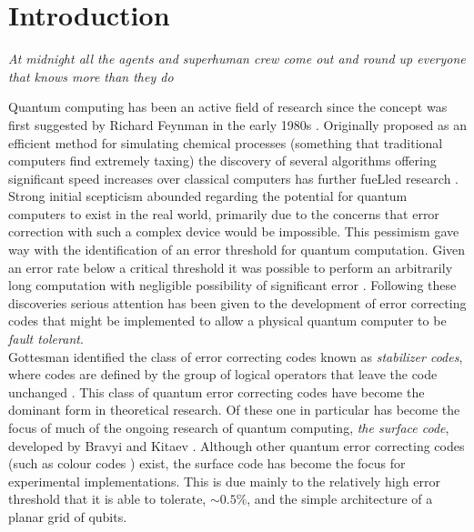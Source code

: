 
\chapter{Introduction}
\epigraph{\textit{At midnight all the agents and superhuman crew come out and round up everyone that knows more than they do}}{}
Quantum computing has been an active field of research since the concept was first suggested by Richard Feynman in the early 1980s \cite{Feynman1982}.
Originally proposed as an efficient method for simulating chemical processes (something that traditional computers find extremely taxing) the discovery of several algorithms offering significant speed increases over classical computers has further fueLled research \cite{Shor1994,Shor1997}.
Strong initial scepticism abounded regarding the potential for quantum computers to exist in the real world, primarily due to the concerns that error correction with such a complex device would be impossible\cite{Preskill1997}.
This pessimism gave way with the identification of an error threshold for quantum computation.
Given an error rate below a critical threshold it was possible to perform an arbitrarily long computation with negligible possibility of significant error \cite{Shor1996,Aharonov1997}.
Following these discoveries serious attention has been given to the development of error correcting codes that might be implemented to allow a physical quantum computer to be \emph{fault tolerant}.
\\
Gottesman identified the class of error correcting codes known as \emph{stabilizer codes}, where codes are defined by the group of logical operators that leave the code unchanged \cite{Gottesman1997a}.
This class of quantum error correcting codes have become the dominant form in theoretical research.
Of these one in particular has become the focus of much of the ongoing research of quantum computing, \emph{the surface code}, developed by Bravyi and Kitaev \cite{Bravyi1998}.
Although other quantum error correcting codes (such as colour codes \cite{Vasmer2018}) exist, the surface code has become the focus for experimental implementations. This is due mainly to the relatively high error threshold that it is able to tolerate, $\sim0.5\%$, and the simple architecture of a planar grid of qubits.
